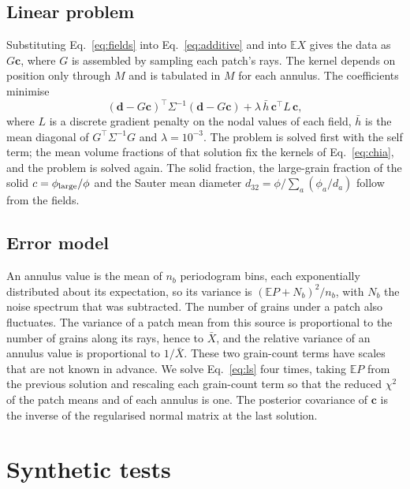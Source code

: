 \documentclass[11pt]{article}
\begin{document}
\subsection{Linear problem}

Substituting Eq.~\eqref{eq:fields} into Eq.~\eqref{eq:additive} and into
$\mathbb{E}X$ gives the data as $G\bm c$, where $G$ is assembled by sampling
each patch's rays. The kernel depends on position only through $M$ and is
tabulated in $M$ for each annulus. The coefficients minimise
\begin{equation}
(\bm d-G\bm c)^\top\Sigma^{-1}(\bm d-G\bm c)+\lambda\,\bar h\,\bm c^\top L\,\bm c,
\label{eq:ls}
\end{equation}
where $L$ is a discrete gradient penalty on the nodal values of each field,
$\bar h$ is the mean diagonal of $G^\top\Sigma^{-1}G$ and $\lambda=10^{-3}$.
The problem is solved first with the self term; the mean volume fractions
of that solution fix the kernels of Eq.~\eqref{eq:chia}, and the problem is
solved again. The solid fraction, the large-grain fraction of the solid
$c=\phi_{\rm large}/\phi$ and the Sauter mean diameter
$d_{32}=\phi/\sum_a(\phi_a/d_a)$ follow from the fields.

\subsection{Error model}

An annulus value is the mean of $n_b$ periodogram bins, each exponentially
distributed about its expectation, so its variance is
$(\mathbb{E}P+N_b)^2/n_b$, with $N_b$ the noise spectrum that was
subtracted. The number of grains under a patch also fluctuates. The variance
of a patch mean from this source is proportional to the number of grains
along its rays, hence to $\bar X$, and the relative variance of an annulus
value is proportional to $1/\bar X$. These two grain-count terms have scales
that are not known in advance. We solve Eq.~\eqref{eq:ls} four times,
taking $\mathbb{E}P$ from the previous solution and rescaling each
grain-count term so that the reduced $\chi^2$ of the patch means and of each
annulus is one. The posterior covariance of $\bm c$ is the inverse of the
regularised normal matrix at the last solution.

\section{Synthetic tests}\label{sec:synthetic}
\end{document}
